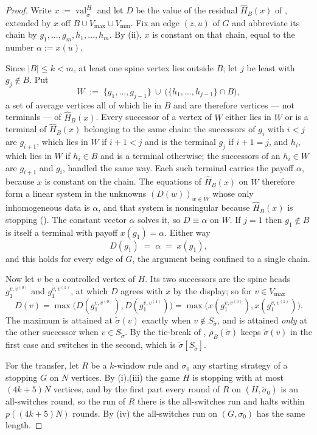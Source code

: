 \documentclass[11pt]{article}
\theoremstyle{plain}
\theoremstyle{definition}
\DeclareMathOperator{\val}{val}
\newcommand{\Vmax}{V_{\max}}
\newcommand{\Vmin}{V_{\min}}
\begin{document}
\begin{proof}
Write $x:=\val^{H}_{\tilde\sigma}$ and let $D$ be the value of the
residual $\widehat H_B(x)$ of , extended by $x$ off
$B\cup\Vmax\cup\Vmin$. Fix an edge $(z,u)$ of $G$ and abbreviate its
chain by $g_1,\dots,g_m,h_1,\dots,h_m$. By (ii),
$x$ is constant on that chain, equal to the number $\alpha:=x(u)$.

Since $|B|\le k<m$, at least one spine vertex lies outside $B$; let $j$
be least with $g_j\notin B$. Put
\[
  W\;:=\;\{g_1,\dots,g_{j-1}\}\ \cup\ \bigl(\{h_1,\dots,h_{j-1}\}\cap B\bigr),
\]
a set of average vertices all of which lie in $B$ and are therefore
vertices --- not terminals --- of $\widehat H_B(x)$. Every successor of a
vertex of $W$ either lies in $W$ or is a terminal of $\widehat H_B(x)$
belonging to the same chain: the successors of $g_i$ with $i<j$ are
$g_{i+1}$, which lies in $W$ if $i+1<j$ and is the terminal $g_j$ if
$i+1=j$, and $h_i$, which lies in $W$ if $h_i\in B$ and is a terminal
otherwise; the successors of an $h_i\in W$ are $g_{i+1}$ and $g_i$,
handled the same way. Each such terminal carries the payoff $\alpha$,
because $x$ is constant on the chain. The equations of
$\widehat H_B(x)$ on $W$ therefore form a linear system in the unknowns
$(D(w))_{w\in W}$ whose only inhomogeneous data is $\alpha$, and that
system is nonsingular because $\widehat H_B(x)$ is stopping
(). The constant vector $\alpha$ solves it, so
$D\equiv\alpha$ on $W$. If $j=1$ then $g_1\notin B$ is itself a terminal
with payoff $x(g_1)=\alpha$. Either way
\[
  D(g_1)\;=\;\alpha\;=\;x(g_1),
\]
and this holds for every edge of $G$, the argument being confined to a
single chain.

Now let $v$ be a controlled vertex of $H$. Its two successors are the
spine heads $g^{v,v^{(0)}}_1$ and $g^{v,v^{(1)}}_1$, at which $D$ agrees
with $x$ by the display; so for $v\in\Vmax$
\[
  D(v)=\max\bigl(D(g^{v,v^{(0)}}_1),D(g^{v,v^{(1)}}_1)\bigr)
      =\max\bigl(x(g^{v,v^{(0)}}_1),x(g^{v,v^{(1)}}_1)\bigr).
\]
The maximum is attained at $\tilde\sigma(v)$ exactly when
$v\notin S_{\tilde\sigma}$, and is attained \emph{only} at the other
successor when $v\in S_{\tilde\sigma}$. By the tie-break of
, $\rho_B(\tilde\sigma)$ keeps $\tilde\sigma(v)$ in the
first case and switches in the second, which is
$\tilde\sigma[S_{\tilde\sigma}]$.

For the transfer, let $R$ be a $k$-window rule and $\sigma_0$ any
starting strategy of a stopping $G$ on $N$ vertices. By
(i),(iii) the game $H$ is stopping with at most
$(4k+5)N$ vertices, and by the first part every round of $R$ on
$(H,\tilde\sigma_0)$ is an all-switches round, so the run of $R$ there is
the all-switches run and halts within $p((4k+5)N)$ rounds. By
(iv) the all-switches run on $(G,\sigma_0)$ has the same
length.


\end{proof}
\end{document}
